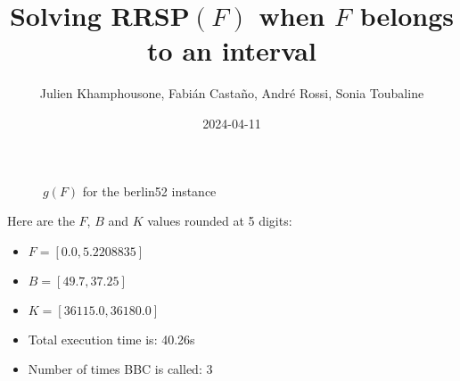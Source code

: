 \documentclass{article}
\begin{document}
     \title{Solving RRSP$(F)$ when $F$ belongs to an interval}
     \author{Julien Khamphousone, Fabi\'an Casta\~no, Andr\'e Rossi, Sonia Toubaline}
     \date{2024-04-11}
     \maketitle
     \def\F{{0.0,0.0522088,0.0574297}}
\def\gF{{361.15,363.7447791,36181.9447791}}
\begin{figure}[ht!]
    \begin{center}
    \end{center}
    \vspace*{-2eM}
    \caption{$g(F)$ for the berlin52 instance}\label{fig:1}
    \end{figure}
    Here are the $F$, $B$ and $K$ values rounded at 5 digits:

\begin{itemize}
	\item  $F = [0.0,5.2208835]$
 \item $B = [49.7,37.25]$
 \item  $K = [36115.0,36180.0]$\item Total execution time is: 40.26s\item Number of times BBC is called: 3\end{itemize}
\end{document}
